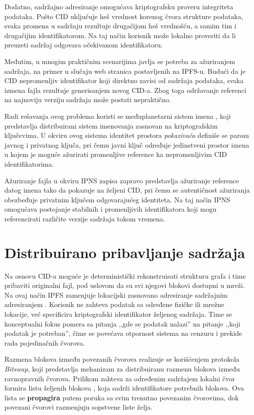 Dodatno, sadržajno adresiranje omogućava kriptografsku proveru integriteta podataka. Pošto CID uključuje heš vrednost korenog čvora strukture podataka, svaka promena u sadržaju rezultuje drugačijom heš vrednošću, a samim tim i drugačijim identifikatorom. Na taj način korisnik može lokalno proveriti da li preuzeti sadržaj odgovara očekivanom identifikatoru.

Međutim, u mnogim praktičnim scenarijima javlja se potreba za ažuriranjem sadržaja, na primer u slučaju web stranica postavljenih na IPFS-u. Budući da je CID nepromenljiv identifikator koji direktno zavisi od sadržaja podataka, svaka izmena fajla rezultuje generisanjem novog CID-a. Zbog toga održavanje referenci na najnoviju verziju sadržaja može postati nepraktično.

Radi rešavanja ovog problema koristi se međuplanetarni sistem imena , koji predstavlja distribuirani sistem imenovanja zasnovan na kriptografskim ključevima. U okviru ovog sistema identitet prostora \textit{pokazivača} definiše se parom javnog i privatnog ključa, pri čemu javni ključ određuje jedinstveni prostor imena u kojem je moguće ažurirati promenljive reference ka nepromenljivim CID identifikatorima.

Ažuriranje fajla u okviru IPNS zapisa zapravo predstavlja ažuriranje reference datog imena tako da pokazuje na željeni CID, pri čemu se autentičnost ažuriranja obezbeđuje privatnim ključem odgovarajućeg identiteta. Na taj način IPNS omogućava postojanje stabilnih i promenljivih identifikatora koji mogu referencirati različite verzije sadržaja tokom vremena.

\section{Distribuirano pribavljanje sadržaja}
Na osnovu CID-a moguće je deterministički rekonstruisati strukturu grafa i time pribaviti originalni fajl, pod uslovom da su svi njegovi blokovi dostupni u mreži. Na ovaj način IPFS zamenjuje lokacijski zasnovano adresiranje sadržajnim adresiranjem . Korisnik ne zahteva podatak sa određene fizičke ili mrežne lokacije, već specificira kriptografski identifikator željenog sadržaja. Time se konceptualni fokus pomera sa pitanja ,,gde se podatak nalazi'' na pitanje ,,koji podatak je potreban'', čime se povećava otpornost sistema na cenzuru i prekide rada pojedinačnih čvorova.

Razmena blokova između povezanih čvorova realizuje se korišćenjem protokola \textit{Bitswap}, koji predstavlja mehanizam za distribuiranu razmenu blokova između ravnopravnih čvorova. Prilikom zahteva za određenim sadržajem lokalni čvor formira listu željenih blokova , koja sadrži identifikatore potrebnih blokova. Ova lista se \textbf{propagira} putem poruka sa svim trenutno povezanim čvorovima, dok povezani čvorovi razmenjuju sopstvene liste želja.

